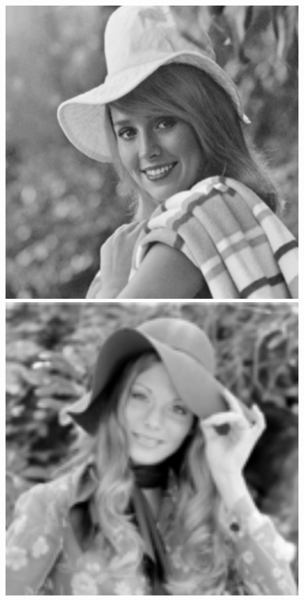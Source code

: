 \documentclass[runningheads]{llncs}
\begin{document}
\begin{figure}[t]
{\begin{minipage}{0.09\textwidth}
\end{minipage}
\begin{minipage}{0.09\textwidth}
\includegraphics[width=1.06\textwidth]{elaine.png}
\end{minipage}
\begin{minipage}{0.09\textwidth}
\includegraphics[width=1.06\textwidth]{hat.png}

\end{minipage}}
\end{figure}
\end{document}
